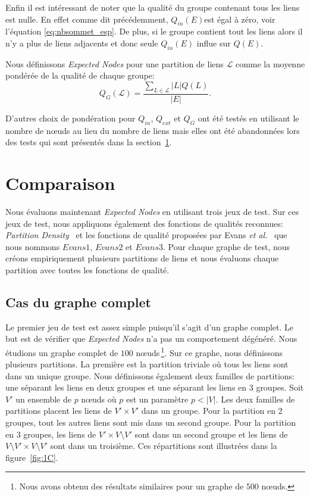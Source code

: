 Enfin il est intéressant de noter que la qualité du groupe contenant tous les liens est nulle.
En effet comme dit précédemment, $Q_{in}(E)$est  égal à zéro, voir l'équation \ref{eq:nbsommet_esp}.
De plus, si le groupe contient tout les liens alors il n'y a plus de liens adjacents et donc seule  $Q_{in}(E)$ influe sur $Q(E)$.



Nous définissons \emph{Expected Nodes} pour une partition de liens $\mathcal{L}$ comme la moyenne pondérée de la qualité de chaque groupe:
\begin{equation}
\label{eq:qualite_globale} Q_G(\mathcal{L}) = \dfrac{\sum_{L\in \mathcal{L}} |L|Q(L)}{|E|}.
\end{equation}

D'autres choix de pondération pour $Q_{in}$, $Q_{ext}$ et $Q_G$ ont été testés en utilisant le nombre de n\oe{}uds au lieu du nombre de liens mais elles ont été abandonnées lors des tests qui sont présentés dans la section~\ref{sec:expected_comp}.

\section{Comparaison}
\label{sec:expected_comp}
Nous évaluons maintenant \emph{Expected Nodes} en utilisant trois jeux de test.
Sur ces jeux de test, nous appliquons également des fonctions de qualités reconnues:
\emph{Partition Density}~\cite{Ahn2010a} et les fonctions de qualité proposées par Evans \emph{et al.}~\cite{Evans2009} que nous nommons $Evans1$, $Evans2$ et $Evans3$.
Pour chaque graphe de test, nous créons empiriquement plusieurs partitions de liens et nous évaluons chaque partition avec toutes les fonctions de qualité.

\subsection{Cas du graphe complet}
\label{Completegraph}
Le premier jeu de test est assez simple puisqu'il s'agit d'un graphe complet.
Le but est de vérifier que \emph{Expected Nodes} n'a pas un comportement dégénéré.
Nous étudions un graphe complet de $100$ n\oe{}uds\,\footnote{Nous avons obtenu des résultats similaires pour un graphe de $500$ n\oe{}uds.}.
Sur ce graphe, nous définissons plusieurs partitions.
La première est la partition triviale où tous les liens sont dans un unique groupe.
Nous définissons également deux familles de partitions: une séparant les liens en deux groupes et une séparant les liens en 3 groupes.
Soit $V'$ un ensemble de $p$ n\oe{}uds où $p$ est un paramètre $p<|V|$.
Les deux familles de partitions placent les liens de $V' \times V'$ dans un groupe.
Pour la partition en 2 groupes, tout les autres liens sont mis dans un second groupe.
Pour la partition en 3 groupes, les liens de $V' \times V\setminus V'$ sont dans un second groupe et les liens de $V \setminus V' \times V\setminus V'$ sont dans un troisième.
Ces répartitions sont illustrées dans la figure~\ref{fig:1C}.

